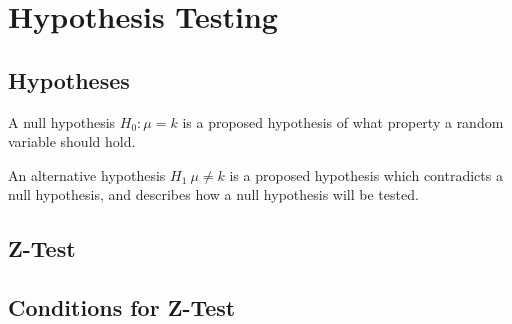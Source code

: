 \documentclass[../main]{subfiles}
\begin{document}
\section{Hypothesis Testing}

	\subsection{Hypotheses}

	A null hypothesis \(H_0 : \mu = k\) is a proposed hypothesis of what property a random variable should hold. 

	An alternative hypothesis \(H_1\: \mu \neq k\) is a proposed hypothesis which contradicts a null hypothesis, and describes how a null hypothesis will be tested. 

	\subsection{Z-Test}

	\subsection{Conditions for Z-Test}
\end{document}
